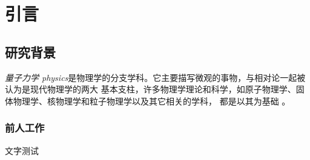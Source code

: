 
\chapter{引言}


\section{研究背景}

\emph{量子力学 physics}是物理学的分支学科。它主要描写微观的事物，与相对论一起被认为是现代物理学的两大
基本支柱，许多物理学理论和科学，如原子物理学、固体物理学、核物理学和粒子物理学以及其它相关的学科，
都是以其为基础 \parencite{曾谨言2013量子力学,feynman2011feynman}。



\subsection{前人工作}

文字测试